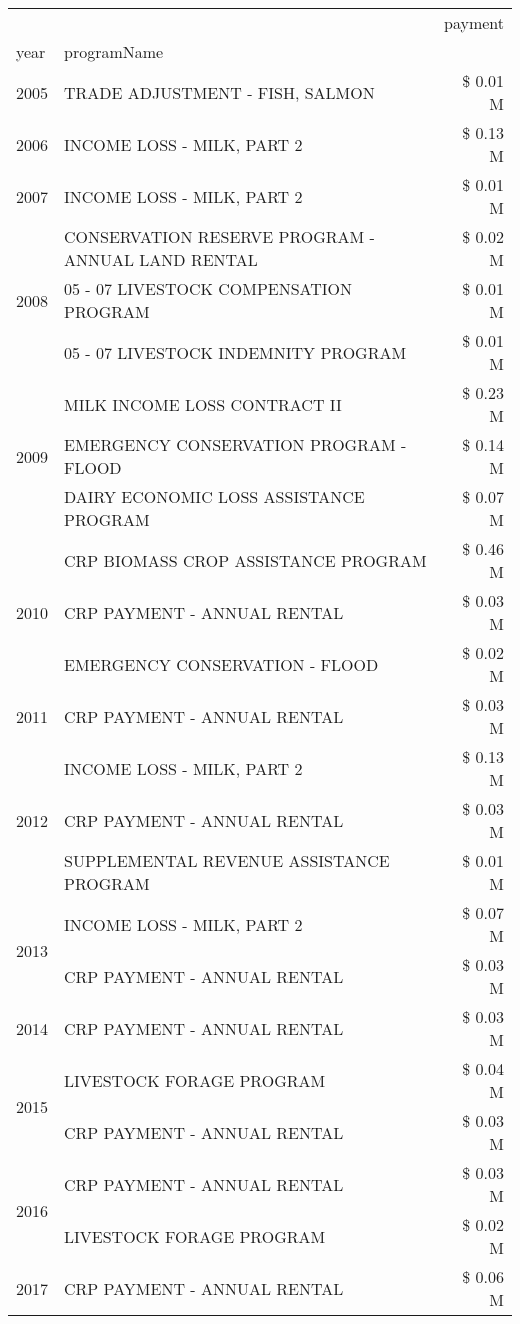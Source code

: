 \begin{tabular}{llr}
\toprule
 &  & payment \\
year & programName &  \\
\midrule
2005 & TRADE ADJUSTMENT - FISH, SALMON & \$ 0.01 M \\
\cline{1-3}
2006 & INCOME LOSS - MILK, PART 2 & \$ 0.13 M \\
\cline{1-3}
2007 & INCOME LOSS - MILK, PART 2 & \$ 0.01 M \\
\cline{1-3}
\multirow[t]{3}{*}{2008} & CONSERVATION RESERVE PROGRAM - ANNUAL LAND RENTAL & \$ 0.02 M \\
 & 05 - 07 LIVESTOCK COMPENSATION PROGRAM & \$ 0.01 M \\
 & 05 - 07 LIVESTOCK INDEMNITY PROGRAM & \$ 0.01 M \\
\cline{1-3}
\multirow[t]{3}{*}{2009} & MILK INCOME LOSS CONTRACT II & \$ 0.23 M \\
 & EMERGENCY CONSERVATION PROGRAM - FLOOD & \$ 0.14 M \\
 & DAIRY ECONOMIC LOSS ASSISTANCE PROGRAM & \$ 0.07 M \\
\cline{1-3}
\multirow[t]{3}{*}{2010} & CRP BIOMASS CROP ASSISTANCE PROGRAM & \$ 0.46 M \\
 & CRP PAYMENT - ANNUAL RENTAL & \$ 0.03 M \\
 & EMERGENCY CONSERVATION - FLOOD & \$ 0.02 M \\
\cline{1-3}
2011 & CRP PAYMENT - ANNUAL RENTAL & \$ 0.03 M \\
\cline{1-3}
\multirow[t]{3}{*}{2012} & INCOME LOSS - MILK, PART 2 & \$ 0.13 M \\
 & CRP PAYMENT - ANNUAL RENTAL & \$ 0.03 M \\
 & SUPPLEMENTAL REVENUE ASSISTANCE PROGRAM & \$ 0.01 M \\
\cline{1-3}
\multirow[t]{2}{*}{2013} & INCOME LOSS - MILK, PART 2 & \$ 0.07 M \\
 & CRP PAYMENT - ANNUAL RENTAL & \$ 0.03 M \\
\cline{1-3}
2014 & CRP PAYMENT - ANNUAL RENTAL & \$ 0.03 M \\
\cline{1-3}
\multirow[t]{2}{*}{2015} & LIVESTOCK FORAGE PROGRAM & \$ 0.04 M \\
 & CRP PAYMENT - ANNUAL RENTAL & \$ 0.03 M \\
\cline{1-3}
\multirow[t]{2}{*}{2016} & CRP PAYMENT - ANNUAL RENTAL & \$ 0.03 M \\
 & LIVESTOCK FORAGE PROGRAM & \$ 0.02 M \\
\cline{1-3}
2017 & CRP PAYMENT - ANNUAL RENTAL & \$ 0.06 M \\

\end{tabular}
